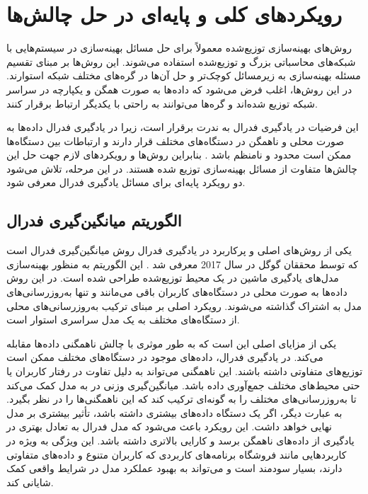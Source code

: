 \section{رویکردهای کلی و پایه‌ای در حل چالش‌ها}
روش‌های بهینه‌سازی توزیع‌شده معمولاً برای حل مسائل بهینه‌سازی در سیستم‌هایی با شبکه‌های محاسباتی بزرگ و توزیع‌شده استفاده می‌شوند. این روش‌ها بر مبنای تقسیم مسئله بهینه‌سازی به زیرمسائل کوچک‌تر و حل آن‌ها در گره‌های مختلف شبکه استوارند. در این روش‌ها، اغلب فرض می‌شود که داده‌ها به صورت همگن و یکپارچه در سراسر شبکه توزیع شده‌اند و گره‌ها می‌توانند به راحتی با یکدیگر ارتباط برقرار کنند.

این فرضیات در یادگیری فدرال به ندرت برقرار است، زیرا در یادگیری فدرال داده‌ها به صورت محلی و ناهمگن در دستگاه‌های مختلف قرار دارند و ارتباطات بین دستگاه‌ها ممکن است محدود و نامنظم باشد
\cite{konevcny2015federated}.
بنابراین روش‌ها و رویکردهای لازم جهت حل این چالش‌ها متفاوت از مسائل بهینه‌سازی توزیع شده هستند. در این مرحله، تلاش می‌شود دو رویکرد پایه‌ای برای مسائل یادگیری فدرال معرفی شود.


\subsection{
	الگوریتم میانگین‌گیری فدرال%
}
یکی از روش‌های اصلی و پرکاربرد در یادگیری فدرال روش میانگین‌گیری فدرال است که توسط محققان گوگل در سال 2017 معرفی شد
\cite{mcmahan2017communication}.
این الگوریتم به منظور بهینه‌سازی مدل‌های یادگیری ماشین در یک محیط توزیع‌شده طراحی شده است. در این روش داده‌ها به صورت محلی در دستگاه‌های کاربران باقی می‌مانند و تنها به‌روزرسانی‌های مدل به اشتراک گذاشته می‌شوند. رویکرد اصلی
بر مبنای ترکیب به‌روزرسانی‌های محلی از دستگاه‌های مختلف به یک مدل سراسری استوار است.

یکی از مزایای اصلی
این است که به طور موثری با چالش ناهمگنی داده‌ها مقابله می‌کند. در یادگیری فدرال، داده‌های موجود در دستگاه‌های مختلف ممکن است توزیع‌های متفاوتی داشته باشند. این ناهمگنی می‌تواند به دلیل تفاوت در رفتار کاربران یا حتی محیط‌های مختلف جمع‌آوری داده باشد. میانگین‌گیری وزنی در
به مدل کمک می‌کند تا به‌روزرسانی‌های مختلف را به گونه‌ای ترکیب کند که این ناهمگنی‌ها را در نظر بگیرد. به عبارت دیگر، اگر یک دستگاه داده‌های بیشتری داشته باشد، تأثیر بیشتری بر مدل نهایی خواهد داشت. این رویکرد باعث می‌شود که مدل فدرال به تعادل بهتری در یادگیری از داده‌های ناهمگن برسد و کارایی بالاتری داشته باشد. این ویژگی به ویژه در کاربردهایی مانند فروشگاه برنامه‌های کاربردی که کاربران متنوع و داده‌های متفاوتی دارند، بسیار سودمند است و می‌تواند به بهبود عملکرد مدل در شرایط واقعی کمک شایانی کند.

